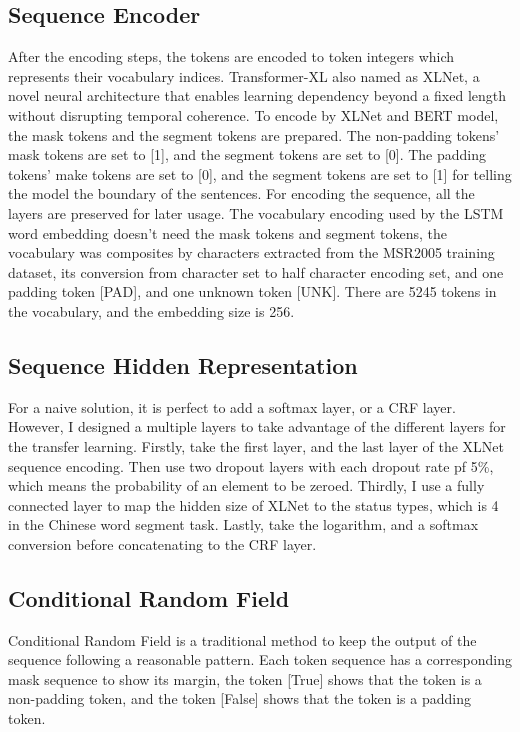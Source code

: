 \documentclass[11pt,a4paper]{article}
\begin{document}
\subsection{Sequence Encoder}

After the encoding steps, the tokens are encoded to token integers which represents their vocabulary indices.
Transformer-XL\citet{dai2019transformer} also named as XLNet, a novel neural architecture that enables learning dependency beyond a fixed length without disrupting temporal coherence.
To encode by XLNet and BERT model, the mask tokens and the segment tokens are prepared.
The non-padding tokens' mask tokens are set to [1], and the segment tokens are set to [0].
The padding tokens' make tokens are set to [0], and the segment tokens are set to [1] for telling the model the boundary of the sentences.
For encoding the sequence, all the layers are preserved for later usage.
The vocabulary encoding used by the LSTM word embedding doesn't need the mask tokens and segment tokens,
the vocabulary was composites by characters extracted from the MSR2005 training dataset, its conversion from character set to half character encoding set,
and one padding token [PAD], and one unknown token [UNK].
There are 5245 tokens in the vocabulary, and the embedding size is 256.

\subsection{Sequence Hidden Representation}

For a naive solution, it is perfect to add a softmax layer, or a CRF layer.
However, I designed a multiple layers to take advantage of the different layers for the transfer learning.
Firstly, take the first layer, and the last layer of the XLNet sequence encoding.
Then use two dropout layers with each dropout rate pf 5\%, which means the probability of an element to be zeroed.
Thirdly, I use a fully connected layer to map the hidden size of XLNet to the status types, which is 4 in the Chinese word segment task.
Lastly, take the logarithm, and a softmax conversion before concatenating to the CRF layer.


\subsection{Conditional Random Field}

Conditional Random Field is a traditional method to keep the output of the sequence following a reasonable pattern.
Each token sequence has a corresponding mask sequence to show its margin, the token [True] shows that the token is a non-padding token,
and the token [False] shows that the token is a padding token.
\end{document}
